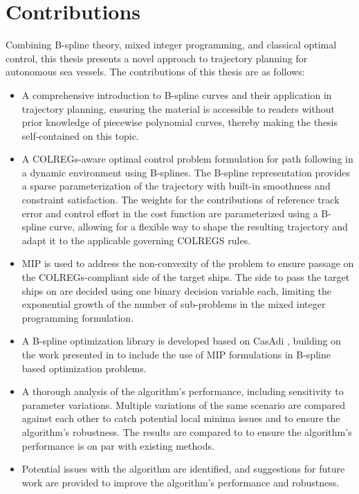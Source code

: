 \section{Contributions}

Combining B-spline theory, mixed integer programming, and classical optimal control, this thesis presents a novel approach to trajectory planning for autonomous sea vessels. The contributions of this thesis are as follows:

\begin{itemize}
    \item A comprehensive introduction to B-spline curves and their application in trajectory planning, ensuring the material is accessible to readers without prior knowledge of piecewise polynomial curves, thereby making the thesis self-contained on this topic.
    \item A COLREGs-aware optimal control problem formulation for path following in a dynamic environment using B-splines. The B-spline representation provides a sparse parameterization of the trajectory with built-in smoothness and constraint satisfaction.
    The weights for the contributions of reference track error and control effort in the cost function are parameterized using a B-spline curve, allowing for a flexible way to shape the resulting trajectory and adapt it to the applicable governing COLREGS rules.
    \item \acrfull{MIP} is used to address the non-convexity of the problem to ensure passage on the COLREGs-compliant side of the target ships.
    The side to pass the target ships on are decided using one binary decision variable each, limiting the exponential growth of the number of sub-problems in the mixed integer programming formulation.
    \item A B-spline optimization library is developed based on CasAdi \citep{casadi}, building on the work presented in \cite{mercy2016spline} to include the use of \acrshort{MIP} formulations in B-spline based optimization problems.
    \item A thorough analysis of the algorithm's performance, including sensitivity to parameter variations. Multiple variations of the same scenario are compared against each other to catch potential local minima issues and to ensure the algorithm's robustness. The results are compared to \cite{Thyri2022-MPC} to ensure the algorithm's performance is on par with existing methods.
    \item Potential issues with the algorithm are identified, and suggestions for future work are provided to improve the algorithm's performance and robustness.
\end{itemize}


